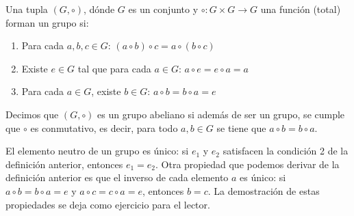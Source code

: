 

\begin{definition}[Grupo]
Una tupla $(G,\circ)$, dónde $G$ es un conjunto y $\circ :G\times G\to G$ una función (total) forman un grupo si:
\begin{enumerate}
	\item Para cada $a,b,c \in G$: $(a \circ b) \circ c = a \circ (b
\circ c)$

	\item Existe $e \in G$ tal que para cada $a \in G$: $a \circ e = e \circ a = a$

   \item Para cada $a \in G$, existe $b \in G$: $a \circ b 	= b \circ a = e$
\end{enumerate}
Decimos que $(G,\circ)$ es un grupo abeliano si además de ser un grupo, se cumple que $\circ$ es conmutativo, es decir, para todo $a,b\in G$ se tiene que $a\circ b = b\circ a$.
\end{definition}

El elemento neutro de un grupo es único: si $e_1$ y $e_2$ satisfacen
la condición 2 de la definición anterior, entonces $e_1= e_2$.  Otra
propiedad que podemos derivar de la definición anterior es que el
inverso de cada elemento $a$ es único: si $a \circ b = b \circ a= e$ y
$a \circ c = c \circ a = e$, entonces $b = c$. La demostración de
estas propiedades se deja como ejercicio para el lector.


